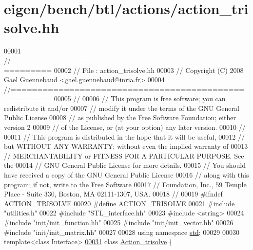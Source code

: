 \hypertarget{eigen_2bench_2btl_2actions_2action__trisolve_8hh_source}{}\section{eigen/bench/btl/actions/action\+\_\+trisolve.hh}
\label{eigen_2bench_2btl_2actions_2action__trisolve_8hh_source}

\begin{DoxyCode}
00001 \textcolor{comment}{//=====================================================}
00002 \textcolor{comment}{// File   :  action\_trisolve.hh}
00003 \textcolor{comment}{// Copyright (C) 2008 Gael Guennebaud <gael.guennebaud@inria.fr>}
00004 \textcolor{comment}{//=====================================================}
00005 \textcolor{comment}{//}
00006 \textcolor{comment}{// This program is free software; you can redistribute it and/or}
00007 \textcolor{comment}{// modify it under the terms of the GNU General Public License}
00008 \textcolor{comment}{// as published by the Free Software Foundation; either version 2}
00009 \textcolor{comment}{// of the License, or (at your option) any later version.}
00010 \textcolor{comment}{//}
00011 \textcolor{comment}{// This program is distributed in the hope that it will be useful,}
00012 \textcolor{comment}{// but WITHOUT ANY WARRANTY; without even the implied warranty of}
00013 \textcolor{comment}{// MERCHANTABILITY or FITNESS FOR A PARTICULAR PURPOSE.  See the}
00014 \textcolor{comment}{// GNU General Public License for more details.}
00015 \textcolor{comment}{// You should have received a copy of the GNU General Public License}
00016 \textcolor{comment}{// along with this program; if not, write to the Free Software}
00017 \textcolor{comment}{// Foundation, Inc., 59 Temple Place - Suite 330, Boston, MA  02111-1307, USA.}
00018 \textcolor{comment}{//}
00019 \textcolor{preprocessor}{#ifndef ACTION\_TRISOLVE}
00020 \textcolor{preprocessor}{#define ACTION\_TRISOLVE}
00021 \textcolor{preprocessor}{#include "utilities.h"}
00022 \textcolor{preprocessor}{#include "STL\_interface.hh"}
00023 \textcolor{preprocessor}{#include <string>}
00024 \textcolor{preprocessor}{#include "init/init\_function.hh"}
00025 \textcolor{preprocessor}{#include "init/init\_vector.hh"}
00026 \textcolor{preprocessor}{#include "init/init\_matrix.hh"}
00027 
00028 \textcolor{keyword}{using namespace }\hyperlink{namespacestd}{std};
00029 
00030 \textcolor{keyword}{template}<\textcolor{keyword}{class} Interface>
\hyperlink{class_action__trisolve}{00031} \textcolor{keyword}{class }\hyperlink{class_action__trisolve}{Action\_trisolve} \{

\end{DoxyCode}
